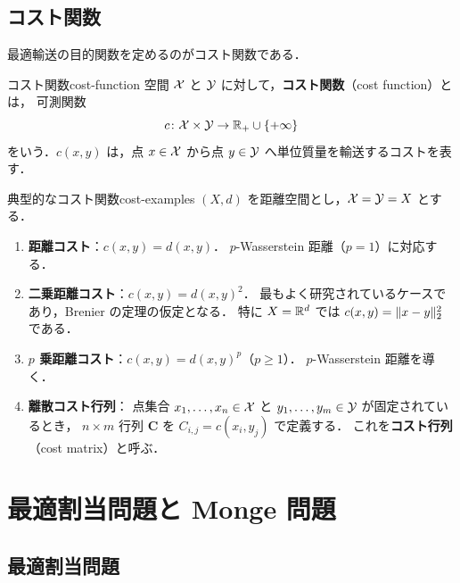 \subsection{コスト関数}
\label{subsec:cost-function}

最適輸送の目的関数を定めるのがコスト関数である．

\begin{definition}{コスト関数}{cost-function}
  空間 $\mathcal{X}$ と $\mathcal{Y}$ に対して，\textbf{コスト関数}（cost function）とは，
  可測関数
  \[
    c \colon \mathcal{X} \times \mathcal{Y} \to \mathbb{R}_+ \cup \{+\infty\}
  \]
  をいう．$c(x, y)$ は，点 $x \in \mathcal{X}$ から点 $y \in \mathcal{Y}$ へ単位質量を輸送するコストを表す．
\end{definition}

\begin{example}{典型的なコスト関数}{cost-examples}
  $(X, d)$ を距離空間とし，$\mathcal{X} = \mathcal{Y} = X$ とする．
  \begin{enumerate}
    \item \textbf{距離コスト}：$c(x, y) = d(x, y)$．
      $p$-Wasserstein 距離（$p=1$）に対応する．
    \item \textbf{二乗距離コスト}：$c(x, y) = d(x, y)^2$．
      最もよく研究されているケースであり，Brenier の定理の仮定となる．
      特に $X = \mathbb{R}^d$ では $c(x,y) = \lVert x-y \rVert_2^2$ である．
    \item \textbf{$p$ 乗距離コスト}：$c(x, y) = d(x, y)^p$（$p \geq 1$）．
      $p$-Wasserstein 距離を導く．
    \item \textbf{離散コスト行列}：
      点集合 $x_1, \ldots, x_n \in \mathcal{X}$ と $y_1, \ldots, y_m \in \mathcal{Y}$ が固定されているとき，
      $n \times m$ 行列 $\mathbf{C}$ を $C_{i,j} = c(x_i, y_j)$ で定義する．
      これを\textbf{コスト行列}（cost matrix）と呼ぶ．
  \end{enumerate}
\end{example}

\section{最適割当問題と Monge 問題}
\label{sec:monge-overview}

\subsection{最適割当問題}
\label{subsec:assignment}

